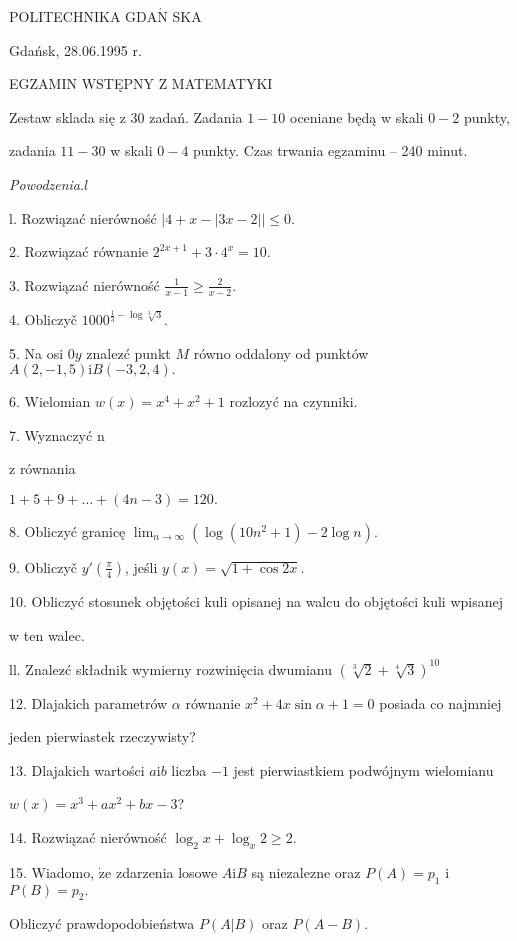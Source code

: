 \documentclass[a4paper,12pt]{article}
\begin{document}
POLITECHNIKA $\mathrm{G}\mathrm{D}\mathrm{A}\acute{\mathrm{N}}$ SKA

Gdańsk, 28.06.1995 r.

EGZAMIN WSTĘPNY Z MATEMATYKI

Zestaw sklada się z 30 zadań. Zadania $1-10$ oceniane będą w skali $0-2$ punkty,

zadania $11-30$ w skali $0-4$ punkty. Czas trwania egzaminu -- 240 minut.

{\it Powodzenia}.$l$

l. Rozwiązać nierówność $|4+x-|3x-2||\leq 0.$

2. Rozwiązać równanie $2^{2x+1}+3\cdot 4^{x}=10.$

3. Rozwiązać nierówność $\displaystyle \frac{1}{x-1}\geq\frac{2}{x-2}.$

4. Obliczyč $1000^{\frac{1}{3}-\log\sqrt[3]{3}}.$

5. Na osi $0y$ znalez$\acute{}$ć punkt $M$ równo oddalony od punktów $A(2,-1,5)\mathrm{i}B(-3,2,4).$

6. Wielomian $w(x)=x^{4}+x^{2}+1$ rozlozyć na czynniki.

7. Wyznaczyć n

z równania

$1+5+9+\ldots+(4n-3)=120.$

8. Obliczyć granicę $\displaystyle \lim_{n\rightarrow\infty}(\log(10n^{2}+1)-2\log n).$

9. Obliczyč $y'(\displaystyle \frac{\pi}{4})$, jeśli $y(x)=\sqrt{1+\cos 2x}.$

10. Obliczyć stosunek objętości kuli opisanej na walcu do objętości kuli wpisanej

w ten walec.

ll. Znalez$\acute{}$ć składnik wymierny rozwinięcia dwumianu $(\sqrt[3]{2}+\sqrt[4]{3})^{10}$

12. Dlajakich parametrów $\alpha$ równanie $x^{2}+4x\sin\alpha+1=0$ posiada co najmniej

jeden pierwiastek rzeczywisty?

13. Dlajakich wartości $a\mathrm{i}b$ liczba $-1$ jest pierwiastkiem podwójnym wielomianu

$w(x)=x^{3}+ax^{2}+bx-3$?

14. Rozwiązać nierówność $\log_{2}x+\log_{x}2\geq 2.$

15. Wiadomo, $\dot{\mathrm{z}}\mathrm{e}$ zdarzenia losowe $A\mathrm{i}B$ są niezalezne oraz $P(A)=p_{1}$ i $P(B)= p_{2}.$

Obliczyć prawdopodobieństwa $P(A|B)$ oraz $P(A-B).$
\end{document}
